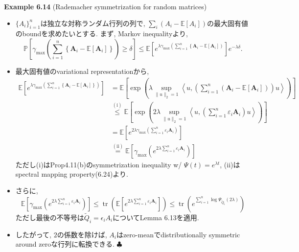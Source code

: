 \documentclass[unicode,aspectratio=169,11pt]{beamer}
\def\endexample{\hfill $\clubsuit$}
\newcommand{\ex}{\mathbb{E}}
\begin{document}
\begin{frame}{}{}
  {\bf Example 6.14} (Rademacher symmetrization for random matrices)
  \begin{itemize}
    \item $\{A_i\}_{i=1}^n$は独立な対称ランダム行列の列で, $\sum_i (A_i - \ex[A_i])$の最大固有値のboundを求めたいとする.
          まず, Markov inequalityより,
          {\small
          \[
            \mathbb{P}\left[\gamma_{\max }\left(\sum_{i=1}^{n}\left\{\mathbf{A}_{i}-\mathbb{E}\left[\mathbf{A}_{i}\right]\right\}\right) \geq \delta\right] \leq \mathbb{E}\left[e^{\lambda \gamma_{\max }\left(\sum_{i=1}^{n}\left\{\mathbf{A}_{i}-\mathbb{E}\left[\mathbf{A}_{i}\right]\right)\right.}\right] e^{-\lambda \delta}.
          \]}
    \item 最大固有値のvariational representationから,
          {\small
            \begin{align*}
              \mathbb{E}\left[e^{\lambda \gamma_{\max }\left(\sum_{i=1}^{n}\left\{\mathbf{A}_{i}-\mathbb{E}\left[\mathbf{A}_{i}\right]\right\}\right)}\right] &=\mathbb{E}\left[\exp \left(\lambda \sup _{\|u\|_{2}=1}\left\langle u,\left(\sum_{i=1}^{n}\left(\mathbf{A}_{i}-\mathbb{E}\left[\mathbf{A}_{i}\right]\right)\right) u\right\rangle\right)\right] \\
              & \stackrel{(\mathrm{i})}{\leq} \mathbb{E}\left[\exp \left(2 \lambda \sup _{\|u\|_{2}=1}\left\langle u,\left(\sum_{i=1}^{n} \varepsilon_{i} \mathbf{A}_{i}\right) u\right\rangle\right)\right] \\
              &=\mathbb{E}\left[e^{2 \lambda \gamma_{\max }\left(\sum_{i=1}^{n} \varepsilon_{i} \mathbf{A}_{i}\right)}\right] \\
              & \stackrel{(\mathrm{ii})}{=} \mathbb{E}\left[\gamma_{\max }\left(e^{2 \lambda \sum_{i=1}^{n} \varepsilon_{i} \mathbf{A}_{i}}\right)\right]
            \end{align*}
          }
          ただし(i)はProp4.11(b)のsymmetrization inequality w/ $\Psi(t) = e^{\lambda t}$,
          (ii)はspectral mapping property(6.24)より.
  \end{itemize}
\end{frame}

\begin{frame}
  \begin{itemize}
    \item さらに,
          \[
            \mathbb{E}\left[\gamma_{\max }\left(e^{2 \lambda \sum_{i=1}^{n} \varepsilon_{i} \mathbf{A}_{i}}\right)\right] \leq \operatorname{tr}\left(\mathbb{E}\left[e^{2 \lambda \sum_{i=1}^{n} \varepsilon_{i} \mathbf{A}_{i}}\right]\right) \leq \operatorname{tr}\left(e^{\sum_{i=1}^{n} \log \Psi_{\widetilde{Q}_{i}}(2 \lambda)}\right)
          \]
          ただし最後の不等号は$\widetilde{Q}_i = \epsilon_iA_i$についてLemma 6.13を適用.
    \item したがって, $2$の係数を除けば, $A_i$はzero-meanでdistributionally symmetric around zeroな行列に転換できる.
    \endexample
  \end{itemize}
\end{frame}
\end{document}
